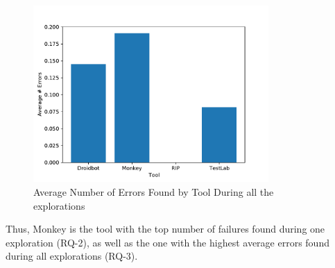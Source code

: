 \begin{figure}[h]
\centering
\includegraphics[width=0.8\textwidth]{../Figures/averageErrors.pdf}
\caption{Average Number of Errors Found by Tool During all the explorations}\label{fig:averagaerrors}
\end{figure}

Thus, Monkey is the tool with the top number of failures found during one exploration (RQ-2), as well as the one with the highest average errors found during all explorations (RQ-3).